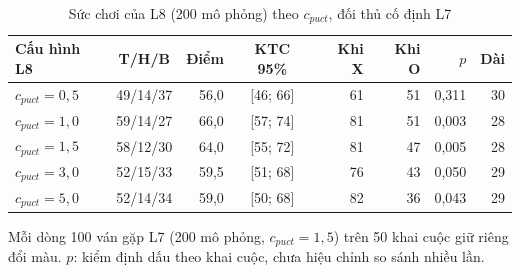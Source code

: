 \begin{table}[H]
  \centering
  \footnotesize
  \caption{Sức chơi của L8 (200 mô phỏng) theo $c_{puct}$, đối thủ cố định L7}
  \label{tab:cs-dn-cpuct}
  \begin{tabular}{lcrcrrrr}
    \toprule
    Cấu hình L8 & T/H/B & Điểm & KTC 95\% & Khi X & Khi O & $p$ & Dài \\
    \midrule
    $c_{puct}=0{,}5$ & 49/14/37 & 56,0 & [46; 66] & 61 & 51 & 0,311 & 30 \\
    $c_{puct}=1{,}0$ & 59/14/27 & 66,0 & [57; 74] & 81 & 51 & 0,003 & 28 \\
    $c_{puct}=1{,}5$ & 58/12/30 & 64,0 & [55; 72] & 81 & 47 & 0,005 & 28 \\
    $c_{puct}=3{,}0$ & 52/15/33 & 59,5 & [51; 68] & 76 & 43 & 0,050 & 29 \\
    $c_{puct}=5{,}0$ & 52/14/34 & 59,0 & [50; 68] & 82 & 36 & 0,043 & 29 \\
    \bottomrule
  \end{tabular}
  \par\smallskip\parbox{.95\linewidth}{\footnotesize Mỗi dòng 100 ván gặp L7 (200 mô phỏng, $c_{puct}=1{,}5$) trên 50 khai cuộc giữ riêng đổi màu. $p$: kiểm định dấu theo khai cuộc, chưa hiệu chỉnh so sánh nhiều lần.}
\end{table}
